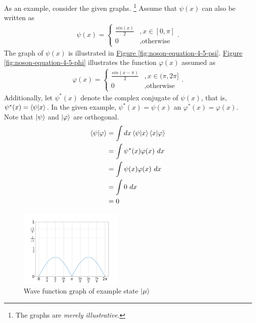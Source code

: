 As an example, consider the given graphs.
\footnote{The graphs are \emph{merely illustrative}.}
Assume that $\psi(x)$ can also be written as
\begin{align}
    \psi(x) = \begin{cases}
        \frac{sin(x)}{2} &, x \in [0, \pi] \\
        0 &, \text{otherwise}
    \end{cases}.
\end{align}
The graph of $\psi(x)$ is illustrated in
\hyperref[fig:noson-equation-4-5-psi]{Figure \ref{fig:noson-equation-4-5-psi}}.
\hyperref[fig:noson-equation-4-5-psi]{Figure \ref{fig:noson-equation-4-5-phi}}
illustrates the function $\varphi(x)$ assumed as
\begin{align}
    \varphi(x) = \begin{cases}
        \frac{sin(x - \pi)}{2} &, x \in (\pi, 2\pi] \\
        0 &, \text{otherwise}
    \end{cases}.
\end{align}
Additionally, let $\psi^*(x)$ denote the complex conjugate of $\psi(x)$,
that is, $\psi^*(x) = \mathop{\mathinner{ \langle{\psi}|{x}\rangle}}$.
In the given example, $\psi^*(x) = \psi(x)$ an $\varphi^*(x) = \varphi(x)$.
Note that $\ket \psi$ and $\ket \varphi$ are orthogonal.
\begin{align}
	\mathop{\mathinner{ \langle{\psi}|{\varphi}\rangle}} &= \int dx \mathop{\mathinner{ \langle{\psi}|{x}\rangle}} \mathop{\mathinner{ \langle{x}|{\varphi}\rangle}} \\
	&= \int \psi^*(x) \varphi(x)\ dx \\
	&= \int \psi(x) \varphi(x)\ dx \\
	&= \int 0\ dx \\
	&= 0
\end{align}

\begin{figure}[htb]
    \centering
    \includegraphics[width=0.45\textwidth]{img/noson/chapter04/section4_1/mu.png}
    \caption{Wave function graph of example state $\ket \mu$}
    \label{fig:noson-equation-4-5-mu}
\end{figure}

